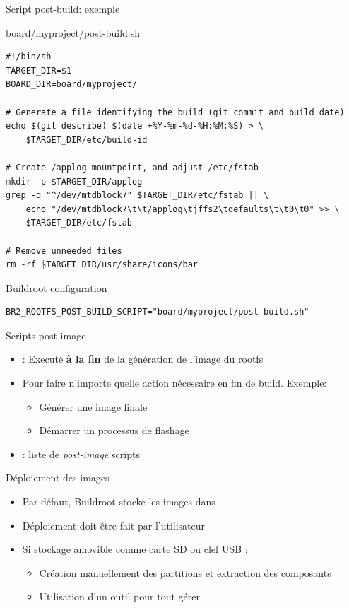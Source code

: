 \documentclass[aspectratio=169,obeyspaces,spaces,hyphens,dvipsnames]{beamer}
\begin{document}
\begin{frame}[fragile]{Script post-build: exemple}

\begin{block}{board/myproject/post-build.sh}
\begin{verbatim}
#!/bin/sh
TARGET_DIR=$1
BOARD_DIR=board/myproject/

# Generate a file identifying the build (git commit and build date)
echo $(git describe) $(date +%Y-%m-%d-%H:%M:%S) > \
    $TARGET_DIR/etc/build-id

# Create /applog mountpoint, and adjust /etc/fstab
mkdir -p $TARGET_DIR/applog
grep -q "^/dev/mtdblock7" $TARGET_DIR/etc/fstab || \
    echo "/dev/mtdblock7\t\t/applog\tjffs2\tdefaults\t\t0\t0" >> \
    $TARGET_DIR/etc/fstab

# Remove unneeded files
rm -rf $TARGET_DIR/usr/share/icons/bar
\end{verbatim}
\end{block}

\begin{block}{Buildroot configuration}
{\scriptsize
\begin{verbatim}
BR2_ROOTFS_POST_BUILD_SCRIPT="board/myproject/post-build.sh"
\end{verbatim}}
\end{block}

\end{frame}

\begin{frame}{Scripts post-image}
  \begin{itemize}
  \item {} : Executé \textbf{à la fin} de la génération
    de l'image du rootfs
  \item Pour faire n'importe quelle action nécessaire en fin de build. Exemple:
    \begin{itemize}
    \item Générer une image finale
    \item Démarrer un processus de flashage
    \end{itemize}
  \item {} : liste de {\em post-image} scripts
  \end{itemize}
\end{frame}

\begin{frame}{Déploiement des images}
  \begin{itemize}
  \item Par défaut, Buildroot stocke les images dans 
  \item Déploiement doit être fait par l'utilisateur
  \item Si stockage amovible comme carte SD ou clef USB :
    \begin{itemize}
    \item Création manuellement des partitions et extraction des composants
    \item Utilisation d'un outil  pour tout gérer
    \end{itemize}
  \end{itemize}
\end{frame}
\end{document}
